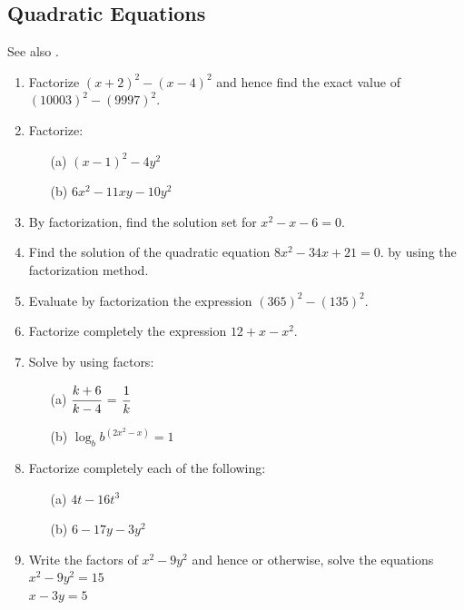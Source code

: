 	\subsection{Quadratic Equations} \label{f2quadeqns}
	See also .
\begin{enumerate}
	
		\subsubsection{Factorization}
	\item Factorize $(x + 2)^2 - (x - 4)^2$ and hence find the exact value of $(10003)^2 - (9997)^2$.
	
	\item Factorize:
	\begin{itemize}
	\item[(a)] $(x - 1)^2 - 4y^2$
	\item[(b)] $6x^2 - 11xy - 10y^2$
	\end{itemize}

	\item By factorization, find the solution set for $x^2 - x - 6 = 0$.
	
	\item Find the solution of the quadratic equation $8x^2 - 34x + 21 = 0$. by using the factorization method.
	
	\item Evaluate by factorization the expression $(365)^2 - (135)^2$.
	
	\item Factorize completely the expression $12 + x - x^2$.
	
	\item Solve by using factors:
	\begin{itemize}
	\item[(a)] $\cfrac{k + 6}{k - 4}$ = $\cfrac{1}{k}$
	\item[(b)] $\log_bb^{(2x^2 - x)} = 1$
	\end{itemize}

	\item Factorize completely each of the following:
	\begin{itemize}
	\item[(a)] $4t - 16t^3$
	\item[(b)] $6 - 17y - 3y^2$
	\end{itemize}
	
	\item Write the factors of $x^2 - 9y^2$ and hence or otherwise, solve the equations\\
	$x^2 - 9y^2 = 15$ \\
	$x - 3y = 5$


\end{enumerate}
